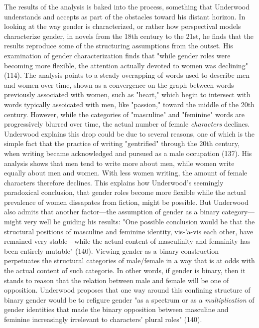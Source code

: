 \documentclass[11pt]{article}
\begin{document}
The results of the analysis is baked into the process, something that
Underwood understands and accepts as part of the obstacles toward his
distant horizon. In looking at the way gender is characterized, or
rather how perspectival models characterize gender, in novels from the
18th century to the 21st, he finds that the results reproduce some of
the structuring assumptions from the outset. His examination of gender
characterization finds that "while gender roles were becoming more
flexible, the attention actually devoted to women was declining"
(114). The analysis points to a steady overapping of words used to
describe men and women over time, shown as a convergence on the graph
between words previously associated with women, such as "heart," which
begin to intersect with words typically assoicated with men, like
"passion," toward the middle of the 20th century. However, while the
categories of "masculine" and "feminine" words are progressively
blurred over time, the actual number of female \emph{characters}
declines. Underwood explains this drop could be due to several
reasons, one of which is the simple fact that the practice of writing
"gentrified" through the 20th century, when writing became
acknowledged and pursued as a male occupation (137). His analysis
shows that men tend to write more about men, while women write equally
about men and women. With less women writing, the amount of female
characters therefore declines. This explains how Underwood's seemingly
paradoxical conclusion, that gender roles become more flexible while
the actual prevalence of women dissapates from fiction, might be
possible. But Underwood also admits that another factor---the
assumption of gender as a binary category---might very well be guiding
his results: "One possible conclusion would be that the structural
positions of masculine and feminine identity, vis-'a-vis each other,
have remained very stable---while the actual content of masculinity
and femninity has been entirely mutable" (140). Viewing gender as a
binary construction perpetuates the structural categories of
male/female in a way that is at odds with the actual content of such
categorie. In other words, if gender is binary, then it stands to
reason that the relation between male and female will be one of
opposition. Underwood proposes that one way around this confining
structure of binary gender would be to refigure gender "as a spectrum
or as a \emph{multiplication} of gender identities that made the binary
opposition between masculine and feminine increasingly irrelevant to
characters' plural roles" (140).
\end{document}
